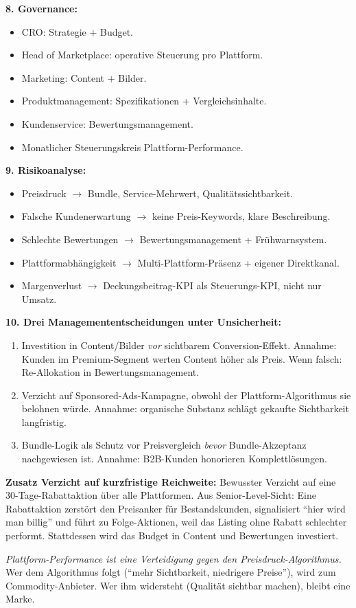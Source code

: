 \documentclass[11pt,a4paper,oneside]{article}
\begin{document}
\begin{loesungbox}
\textbf{8. Governance:}
\begin{itemize}
  \item CRO: Strategie + Budget.
  \item Head of Marketplace: operative Steuerung pro Plattform.
  \item Marketing: Content + Bilder.
  \item Produktmanagement: Spezifikationen + Vergleichsinhalte.
  \item Kundenservice: Bewertungsmanagement.
  \item Monatlicher Steuerungskreis Plattform-Performance.
\end{itemize}

\textbf{9. Risikoanalyse:}
\begin{itemize}
  \item Preisdruck $\rightarrow$ Bundle, Service-Mehrwert, Qualitätssichtbarkeit.
  \item Falsche Kundenerwartung $\rightarrow$ keine Preis-Keywords, klare Beschreibung.
  \item Schlechte Bewertungen $\rightarrow$ Bewertungsmanagement + Frühwarnsystem.
  \item Plattformabhängigkeit $\rightarrow$ Multi-Plattform-Präsenz + eigener Direktkanal.
  \item Margenverlust $\rightarrow$ Deckungsbeitrag-KPI als Steuerungs-KPI, nicht nur Umsatz.
\end{itemize}

\textbf{10. Drei Managemententscheidungen unter Unsicherheit:}
\begin{enumerate}
  \item Investition in Content/Bilder \emph{vor} sichtbarem Conversion-Effekt. Annahme: Kunden im Premium-Segment werten Content höher als Preis. Wenn falsch: Re-Allokation in Bewertungsmanagement.
  \item Verzicht auf Sponsored-Ads-Kampagne, obwohl der Plattform-Algorithmus sie belohnen würde. Annahme: organische Substanz schlägt gekaufte Sichtbarkeit langfristig.
  \item Bundle-Logik als Schutz vor Preisvergleich \emph{bevor} Bundle-Akzeptanz nachgewiesen ist. Annahme: B2B-Kunden honorieren Komplettlösungen.
\end{enumerate}

\textbf{Zusatz \textendash{} Verzicht auf kurzfristige Reichweite:}
Bewusster Verzicht auf eine 30-Tage-Rabattaktion über alle Plattformen. Aus Senior-Level-Sicht: Eine Rabattaktion zerstört den Preisanker für Bestandskunden, signalisiert ``hier wird man billig'' und führt zu Folge-Aktionen, weil das Listing ohne Rabatt schlechter performt. Stattdessen wird das Budget in Content und Bewertungen investiert.

\begin{merkbox}
\emph{Plattform-Performance ist eine Verteidigung gegen den Preisdruck-Algorithmus.} Wer dem Algorithmus folgt (``mehr Sichtbarkeit, niedrigere Preise''), wird zum Commodity-Anbieter. Wer ihm widersteht (Qualität sichtbar machen), bleibt eine Marke.
\end{merkbox}
\end{loesungbox}
\end{document}
